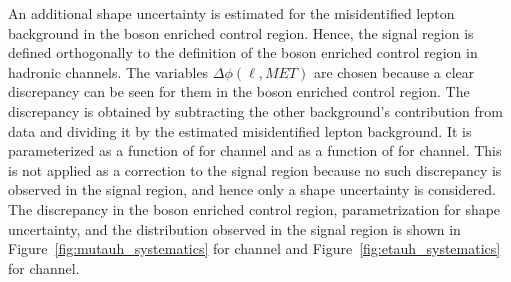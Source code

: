 An additional shape uncertainty is estimated for the misidentified lepton background in the \PW boson enriched control region. Hence, the signal region is defined orthogonally to the definition of the \PW boson enriched control region in hadronic channels. The variables $\Delta\phi(\ell, MET)$ are chosen because a clear discrepancy can be seen for them in the \PW boson enriched control region. The discrepancy is obtained by subtracting the other background's contribution from data and dividing it by the estimated misidentified lepton background. It is parameterized as a function of \dphimmet for \muhad channel and as a function of \dphiemet for \ehad channel. This is not applied as a correction to the signal region because no such discrepancy is observed in the signal region, and hence only a shape uncertainty is considered. The discrepancy in the \PW boson enriched control region, parametrization for shape uncertainty, and the distribution observed in the signal region is shown in Figure~\ref{fig:mutauh_systematics} for \Hmuhad channel and Figure~\ref{fig:etauh_systematics} for \Hehad channel.


